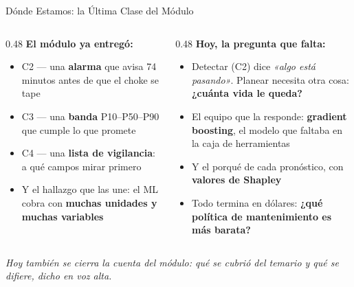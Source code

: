 \documentclass[aspectratio=169, 11pt]{beamer}
\begin{document}
\begin{frame}[shrink=8]{Dónde Estamos: la Última Clase del Módulo}
  \vspace{-2pt}
  \begin{columns}[T]
    \begin{column}{0.48\textwidth}
      {\small\color{arcaDark}\bfseries\faCheckCircle\hspace{5pt}El módulo ya entregó:}
      \vspace{4pt}
      {\footnotesize\color{textMuted}
      \begin{itemize}\setlength{\itemsep}{4pt}
        \item[{\color{codeGreen}\scriptsize\faCheck}]
          C2 --- una \textbf{alarma} que avisa 74 minutos antes de que el
          choke se tape
        \item[{\color{codeGreen}\scriptsize\faCheck}]
          C3 --- una \textbf{banda} P10--P50--P90 que cumple lo que promete
        \item[{\color{codeGreen}\scriptsize\faCheck}]
          C4 --- una \textbf{lista de vigilancia}: a qué campos mirar primero
        \item[{\color{codeGreen}\scriptsize\faCheck}]
          Y el hallazgo que las une: el ML cobra con \textbf{muchas unidades
          y muchas variables}
      \end{itemize}}
    \end{column}
    \begin{column}{0.48\textwidth}
      {\small\color{arcaDark}\bfseries\faForward\hspace{5pt}Hoy, la pregunta que falta:}
      \vspace{4pt}
      {\footnotesize\color{textMuted}
      \begin{itemize}\setlength{\itemsep}{4pt}
        \item[{\color{arcaRed}\scriptsize\faArrowRight}]
          Detectar (C2) dice \emph{«algo está pasando»}. Planear necesita
          otra cosa: \textbf{¿cuánta vida le queda?}
        \item[{\color{arcaRed}\scriptsize\faArrowRight}]
          El equipo que la responde: \textbf{gradient boosting}, el modelo
          que faltaba en la caja de herramientas
        \item[{\color{arcaRed}\scriptsize\faArrowRight}]
          Y el porqué de cada pronóstico, con \textbf{valores de Shapley}
        \item[{\color{arcaRed}\scriptsize\faStar}]
          Todo termina en dólares: \textbf{¿qué política de mantenimiento
          es más barata?}
      \end{itemize}}
    \end{column}
  \end{columns}
  \vspace{5pt}
  {\scriptsize\color{arcaDark}\itshape
   Hoy también se cierra la cuenta del módulo: qué se cubrió del temario y
   qué se difiere, dicho en voz alta.}
\end{frame}
\end{document}
